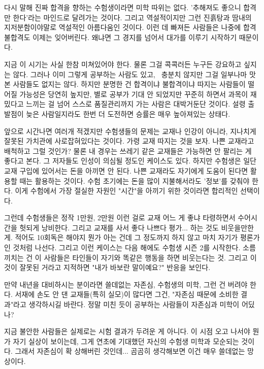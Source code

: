 다시 말해 진짜 합격을 향하는 수험생이라면 미학 따위는 없다. '추해져도 좋으니 합격만 한다'라는 마인드로 달려가는 것이다.
그리고 역설적이지만 그런 진흙탕과 땀내의 지저분함이야말로 역설적인 아름다움인 것이다.
이런 데 빠져든 사람들은 나중에 합격 불합격도 이제는 잊어버린다. 왜냐면 그 경지를 넘어서 대가를 이루기 시작하기 때문이다.
\vspace{5mm}

지금 이 시기는 사실 한참 미쳐있어야 한다. 물론 그걸 콕콕러든 누구든 강요하고 싶지는 않다.
그러나 이미 그렇게 공부하는 사람도 있고,  충분치 않지만 그걸 일부나마 맛본 사람들도 없지는 않다.
하지만 분명한 건 합격이냐 불합격이냐 따지는 사람들이 떨어질 가능성은 당연히 높지만,
별로 공부가 기대 안 되었지만 꾸준히 하면서 과목이 재밌다고 느끼는 걸 넘어 스스로 품질관리까지 가는 사람은 대박거둔단 것이다.
설령 출발점이 늦은 사람일지라도 한번 더 도전하면 승률은 매우 높아져있는 상태다.
\vspace{5mm}

앞으로 시간나면 여러개 적겠지만 수험생들의 문제는 교재나 인강이 아니라, 지나치게 잘못된 가치관에 사로잡혀있다는 것이다.
가령 교재 따지는 것을 보자. 나쁜 교재라고 배척하고 그럴 것인가?
물론 내 경우는 쓰레기 같은 교재들은 가능하면 안 팔리는 게 좋다고 본다. 그 저자들도 인성이 의심될 정도인 케이스도 있다.
하지만 수험생은 일단 교재 구입에 있어서는 돈을 아끼면 안 된다.
나쁜 교재라도 자기에게 도움이 된다면 활용할 때는 활용하는 것이다.
수험 초기에는 돈을 많이 지불해서라도 '정보'를 갖춰야 한다.
이게 수험에서 가장 절실한 자원인 "시간"을 아끼기 위한 것이라면 합리적인 선택이다.
\vspace{5mm}

그런데 수험생들은 정작 1만원, 2만원 이런 걸로 교재 어느 게 좋냐 타령하면서 수어시간을 헛되게 낭비한다.
그리고 교재를 사서 좋다 나쁘다 평가... 하는 것도 비웃을만한 게. 적어도 10회독은 해야지 뭔가 아는 건데
그 정도까지 하지 않고 마치 자기가 평론가인 것처럼 나선다. 그리고 이런 케이스는 다음 해에도 수험생 시즌 2를 시작한다.
소름끼치는 건 이 사람들은 타인들이 자기와 똑같은 행동을 하면 비웃는다는 것.
그리고 이것이 잘못된 거라고 지적하면 "내가 바보란 말이예요?" 반응을 보인다.
\vspace{5mm}

만약 내년을 대비하시는 분이라면 쓸데없는 자존심, 수험생의 미학, 그런 건 버려야 한다.
서재에 손도 안 댄 교재들(특히 실모)이 많다면 그건, "자존심 때문에 소비한 결과"라고 생각하시길 바란다.
정말 미친 듯이 공부하는 사람들이 자존심과 미학이 어딨나?
\vspace{5mm}

지금 불안한 사람들은 실제로는 시험 결과가 두려운 게 아니다.
이 시점 오고 나서야 뭔가 자기 실상이 보이는데, 그게 연초에 기대했던 자신의 수험생 미학과 모순되는 것이다.
그래서 자존심이 확 상해버린 것인데... 곰곰히 생각해보면 이건 매우 쓸데없는 망상이다.
\vspace{5mm}

